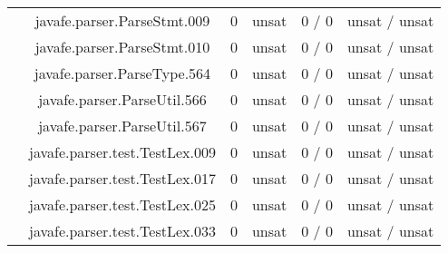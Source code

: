 \begin{table}[htbp]
\begin{minipage}{0.60\textwidth}
{\begin{tabular}[c]{c c!{\vrule width 1.5pt}c|c!{\vrule width 1.5pt}c|c|}
 			& javafe.parser.ParseStmt.009		   		      & 0    & unsat   & 0  / 0    & unsat / unsat  \\
 			& javafe.parser.ParseStmt.010		   		      & 0    & unsat   & 0  / 0    & unsat / unsat  \\
 			& javafe.parser.ParseType.564		   		      & 0    & unsat   & 0  / 0    & unsat / unsat  \\
 			& javafe.parser.ParseUtil.566		   		      & 0    & unsat   & 0  / 0    & unsat / unsat  \\
 			& javafe.parser.ParseUtil.567		   		      & 0    & unsat   & 0  / 0    & unsat / unsat  \\
 			& javafe.parser.test.TestLex.009	   		      & 0    & unsat   & 0  / 0    & unsat / unsat  \\
 			& javafe.parser.test.TestLex.017	   		      & 0    & unsat   & 0  / 0    & unsat / unsat  \\
 			& javafe.parser.test.TestLex.025	   		      & 0    & unsat   & 0  / 0    & unsat / unsat  \\
 			& javafe.parser.test.TestLex.033	   		      & 0    & unsat   & 0  / 0    & unsat / unsat  \\

\end{tabular}}
\end{minipage}
\end{table}
